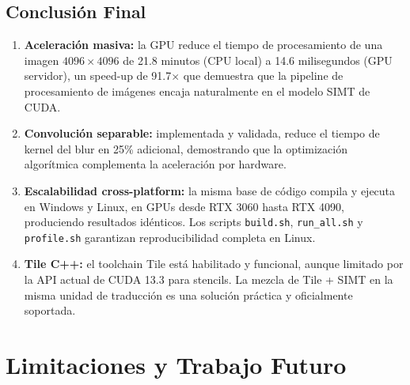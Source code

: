 \documentclass[12pt,a4paper]{article}
\begin{document}
\subsection{Conclusi\'on Final}

\begin{enumerate}
  \item \textbf{Aceleraci\'on masiva:} la GPU reduce el tiempo de procesamiento de una imagen $4096 \times 4096$ de 21.8 minutos (CPU local) a 14.6 milisegundos (GPU servidor), un speed-up de 91.7$\times$ que demuestra que la pipeline de procesamiento de im\'agenes encaja naturalmente en el modelo SIMT de CUDA.
  \item \textbf{Convoluci\'on separable:} implementada y validada, reduce el tiempo de kernel del blur en 25\% adicional, demostrando que la optimizaci\'on algor\'itmica complementa la aceleraci\'on por hardware.
  \item \textbf{Escalabilidad cross-platform:} la misma base de c\'odigo compila y ejecuta en Windows y Linux, en GPUs desde RTX 3060 hasta RTX 4090, produciendo resultados id\'enticos. Los scripts \texttt{build.sh}, \texttt{run\_all.sh} y \texttt{profile.sh} garantizan reproducibilidad completa en Linux.
  \item \textbf{Tile C++:} el toolchain Tile est\'a habilitado y funcional, aunque limitado por la API actual de CUDA 13.3 para stencils. La mezcla de Tile + SIMT en la misma unidad de traducci\'on es una soluci\'on pr\'actica y oficialmente soportada.
\end{enumerate}

\section{Limitaciones y Trabajo Futuro}
\end{document}
